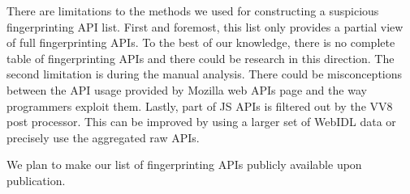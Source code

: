 There are limitations to the methods we used for constructing a suspicious fingerprinting API list. First and foremost, this list only provides a partial view of full fingerprinting APIs. To the best of our knowledge, there is no complete table of fingerprinting APIs and there could be research in this direction. The second limitation is during the manual analysis. There could be misconceptions between the API usage provided by Mozilla web APIs page and the way programmers exploit them. Lastly, part of JS APIs is filtered out by the VV8 post processor. This can be improved by using a larger set of WebIDL data or precisely use the aggregated raw APIs. 

We plan to make our list of fingerprinting APIs publicly available upon publication.